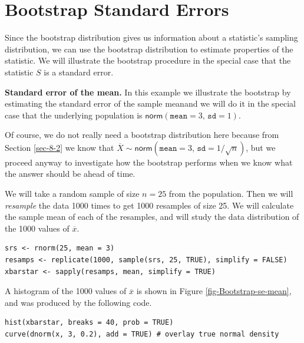 \documentclass[captions=tableheading]{scrbook}
\begin{document}
\section{Bootstrap Standard Errors}
\label{sec-13-2}
\label{sec-Bootstrap-Standard-Errors}


Since the bootstrap distribution gives us information about a statistic's sampling distribution, we can use the bootstrap distribution to estimate properties of the statistic. We will illustrate the bootstrap procedure in the special case that the statistic \(S\) is a standard error. 

\begin{example}

\textbf{Standard error of the mean.}  In this example we illustrate the bootstrap by estimating the standard error of the sample meanand we will do it in the special case that the underlying population is \(\mathsf{norm}(\mathtt{mean}=3,\,\mathtt{sd}=1)\).  

Of course, we do not really need a bootstrap distribution here because from Section \ref{sec-8-2} we know that \(\overline{X}\sim\mathsf{norm}(\mathtt{mean}=3,\,\mathtt{sd}=1/\sqrt{n})\), but we proceed anyway to investigate how the bootstrap performs when we know what the answer should be ahead of time.

We will take a random sample of size \(n=25\) from the population. Then we will \emph{resample} the data 1000 times to get 1000 resamples of size 25. We will calculate the sample mean of each of the resamples, and will study the data distribution of the 1000 values of \(\overline{x}\).


\lstset{language=R}
\begin{lstlisting}
srs <- rnorm(25, mean = 3)
resamps <- replicate(1000, sample(srs, 25, TRUE), simplify = FALSE)
xbarstar <- sapply(resamps, mean, simplify = TRUE)
\end{lstlisting}

A histogram of the 1000 values of \(\overline{x}\) is shown in Figure \ref{fig-Bootstrap-se-mean}, and was produced by the following code.


\lstset{language=R}
\begin{lstlisting}
hist(xbarstar, breaks = 40, prob = TRUE)
curve(dnorm(x, 3, 0.2), add = TRUE) # overlay true normal density
\end{lstlisting}






\end{example}
\end{document}

